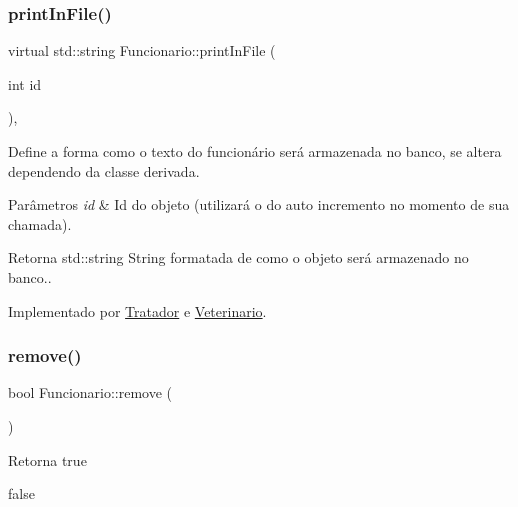 \subsubsection{\texorpdfstring{print\+In\+File()}{printInFile()}}
{\footnotesize\ttfamily virtual std\+::string Funcionario\+::print\+In\+File (\begin{DoxyParamCaption}\item[{int}]{id }\end{DoxyParamCaption})\hspace{0.3cm}{\ttfamily [protected]}, {}}



Define a forma como o texto do funcionário será armazenada no banco, se altera dependendo da classe derivada. 


\begin{DoxyParams}{Parâmetros}
{\em id} & Id do objeto (utilizará o do auto incremento no momento de sua chamada). \\
\hline
\end{DoxyParams}
\begin{DoxyReturn}{Retorna}
std\+::string String formatada de como o objeto será armazenado no banco.. 
\end{DoxyReturn}


Implementado por \hyperlink{classTratador_af2efc58696c20320f51741d01a958ef7}{Tratador} e \hyperlink{classVeterinario_a9c922980caf0113e0e9048ea3528e88d}{Veterinario}.

\mbox{\label{classFuncionario_a0ea198bfb72865e5e0bf913c62020275}} 
\subsubsection{\texorpdfstring{remove()}{remove()}}
{\footnotesize\ttfamily bool Funcionario\+::remove (\begin{DoxyParamCaption}{ }\end{DoxyParamCaption})}

\begin{DoxyReturn}{Retorna}
true 

false 
\end{DoxyReturn}
\mbox{\label{classFuncionario_acb246ecc22f9135f2adad51a131ea45c}} 
